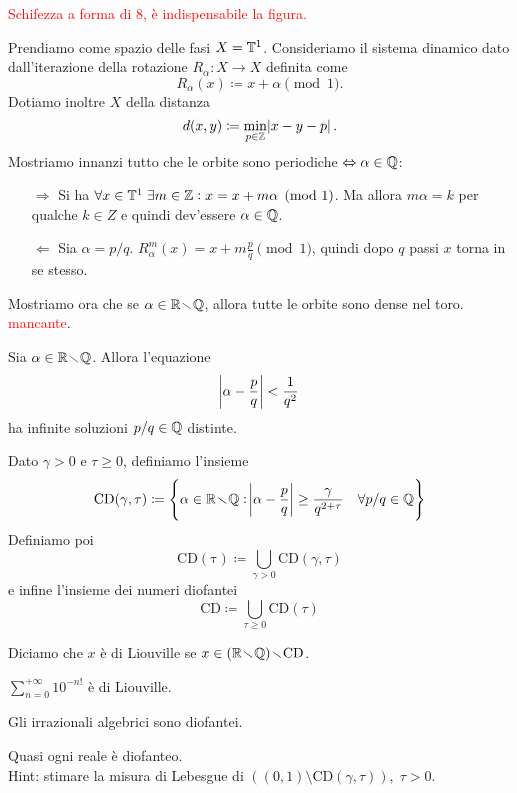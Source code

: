 \begin{example}
    \textcolor{red}{Schifezza a forma di 8, è indispensabile la figura.}
\end{example}

\begin{example}
    Prendiamo come spazio delle fasi $ X = \mathbb{T}^1 $. Consideriamo il sistema dinamico dato dall'iterazione della rotazione $ R_\alpha\colon X\to X $ definita come
    \[ R_\alpha(x) \coloneqq x + \alpha \pmod{1}. \]
    Dotiamo inoltre $ X $ della distanza
    \[ d(x,y) \coloneqq \min_{p\in\mathbb{Z}} \abs{x-y-p}. \]
    Mostriamo innanzi tutto che le orbite sono periodiche $ \Leftrightarrow \alpha\in\mathbb{Q} $:
    \begin{itemize}
        \item[$\Rightarrow$] Si ha $ \forall x\in\mathbb{T}^1\; \exists m\in\mathbb{Z} : x = x + m\alpha \pmod{1} $. Ma allora $ m\alpha = k $ per qualche $ k\in Z $ e quindi dev'essere $ \alpha\in\mathbb{Q} $.
        \item[$\Leftarrow$] Sia $ \alpha = p/q $. $ R_\alpha^m(x) = x + m\frac{p}{q} \pmod{1} $, quindi dopo $ q $ passi $ x $ torna in se stesso.
    \end{itemize}
    Mostriamo ora che se $ \alpha\in\mathbb{R}\!\smallsetminus\!\mathbb{Q} $, allora tutte le orbite sono dense nel toro.
    \textcolor{red}{mancante}.
\end{example}

\begin{exercise}
    Sia $ \alpha \in \mathbb{R}\!\smallsetminus\!\mathbb{Q} $. Allora l'equazione
    \[ \abs{\alpha - \frac{p}{q}} < \frac{1}{q^2} \]
    ha infinite soluzioni $ p/q \in\mathbb{Q} $ distinte.
\end{exercise}

\begin{definition}
    Dato $ \gamma > 0 $ e $ \tau \geq 0 $, definiamo l'insieme
    \[ \mathrm{CD(\gamma,\tau)} \coloneqq \left\{ \alpha\in\mathbb{R}\!\smallsetminus\!\mathbb{Q} : \abs{\alpha - \frac{p}{q}} \geq \frac{\gamma}{q^{2+\tau}}\quad \forall p/q\in\mathbb{Q} \right\} \]
    Definiamo poi
    \[ \mathrm{CD(\tau)} \coloneqq \bigcup_{\gamma > 0} \mathrm{CD}(\gamma,\tau) \]
    e infine l'insieme dei numeri diofantei
    \[ \mathrm{CD} \coloneqq \bigcup_{\tau \geq 0} \mathrm{CD}(\tau) \]
\end{definition}

\begin{definition}
    Diciamo che $ x $ è di Liouville se $ x\in (\mathbb{R}\!\smallsetminus\!\mathbb{Q}) \!\smallsetminus\! \mathrm{CD} $.
\end{definition}

\begin{exercise}
    $ \sum_{n=0}^{+\infty} 10^{-n!} $ è di Liouville.
\end{exercise}
\begin{exercise}
    Gli irrazionali algebrici sono diofantei.
\end{exercise}
\begin{exercise}
    Quasi ogni reale è diofanteo.\\
    Hint: stimare la misura di Lebesgue di $ ( (0,1) \setminus \mathrm{CD}(\gamma,\tau) ),\; \tau > 0 $.
\end{exercise}

